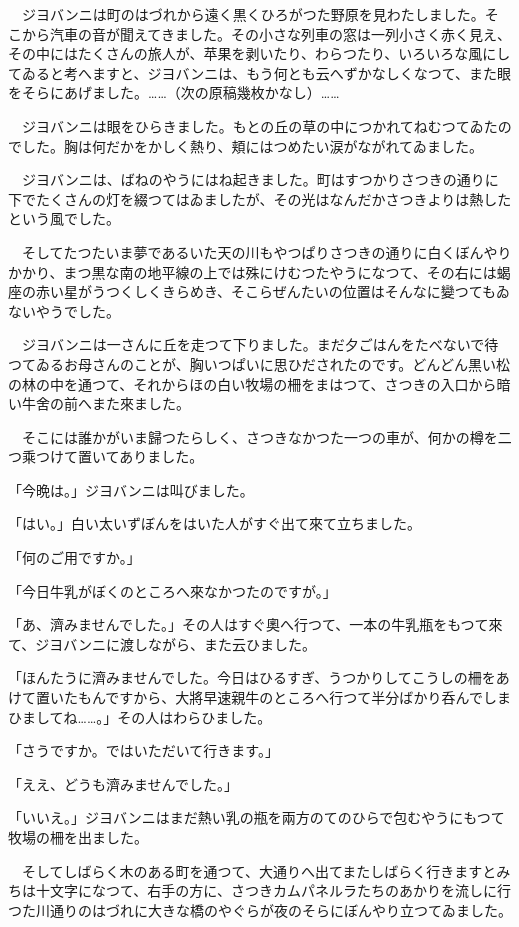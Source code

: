 \documentclass[tate,paper=b6j,jafontsize=9pt]{jlreq}
\begin{document}
　ジヨバンニは町のはづれから遠く黒くひろがつた野原を見わたしました。そこから汽車の音が聞えてきました。その小さな列車の窓は一列小さく赤く見え、その中にはたくさんの旅人が、苹果を剥いたり、わらつたり、いろいろな風にしてゐると考へますと、ジヨバンニは、もう何とも云へずかなしくなつて、また眼をそらにあげました。……（次の原稿幾枚かなし）……


　ジヨバンニは眼をひらきました。もとの丘の草の中につかれてねむつてゐたのでした。胸は何だかをかしく熱り、頬にはつめたい涙がながれてゐました。

　ジヨバンニは、ばねのやうにはね起きました。町はすつかりさつきの通りに下でたくさんの灯を綴つてはゐましたが、その光はなんだかさつきよりは熱したという風でした。

　そしてたつたいま夢であるいた天の川もやつぱりさつきの通りに白くぼんやりかかり、まつ黒な南の地平線の上では殊にけむつたやうになつて、その右には蝎座の赤い星がうつくしくきらめき、そこらぜんたいの位置はそんなに變つてもゐないやうでした。

　ジヨバンニは一さんに丘を走つて下りました。まだ夕ごはんをたべないで待つてゐるお母さんのことが、胸いつぱいに思ひだされたのです。どんどん黒い松の林の中を通つて、それからほの白い牧場の柵をまはつて、さつきの入口から暗い牛舍の前へまた來ました。

　そこには誰かがいま歸つたらしく、さつきなかつた一つの車が、何かの樽を二つ乘つけて置いてありました。

「今晩は。」ジヨバンニは叫びました。

「はい。」白い太いずぼんをはいた人がすぐ出て來て立ちました。

「何のご用ですか。」

「今日牛乳がぼくのところへ來なかつたのですが。」

「あ、濟みませんでした。」その人はすぐ奧へ行つて、一本の牛乳瓶をもつて來て、ジヨバンニに渡しながら、また云ひました。

「ほんたうに濟みませんでした。今日はひるすぎ、うつかりしてこうしの柵をあけて置いたもんですから、大將早速親牛のところへ行つて半分ばかり呑んでしまひましてね……。」その人はわらひました。

「さうですか。ではいただいて行きます。」

「ええ、どうも濟みませんでした。」

「いいえ。」ジヨバンニはまだ熱い乳の瓶を兩方のてのひらで包むやうにもつて牧場の柵を出ました。

　そしてしばらく木のある町を通つて、大通りへ出てまたしばらく行きますとみちは十文字になつて、右手の方に、さつきカムパネルラたちのあかりを流しに行つた川通りのはづれに大きな橋のやぐらが夜のそらにぼんやり立つてゐました。
\end{document}
